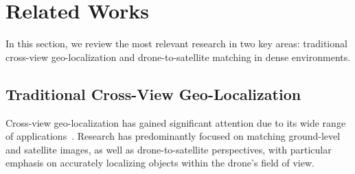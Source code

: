 \section{Related Works}
\label{Related Works}
In this section, we review the most relevant research in two key areas: traditional cross-view geo-localization and drone-to-satellite matching in dense environments.

\subsection{Traditional Cross-View Geo-Localization}
Cross-view geo-localization has gained significant attention due to its wide range of applications~\cite{cheng2023ai, shadiev2023systematic, molina2023review, bakirci2024enhancing}.
Research has predominantly focused on matching ground-level and satellite images, as well as drone-to-satellite perspectives, with particular emphasis on accurately localizing objects within the drone's field of view.

